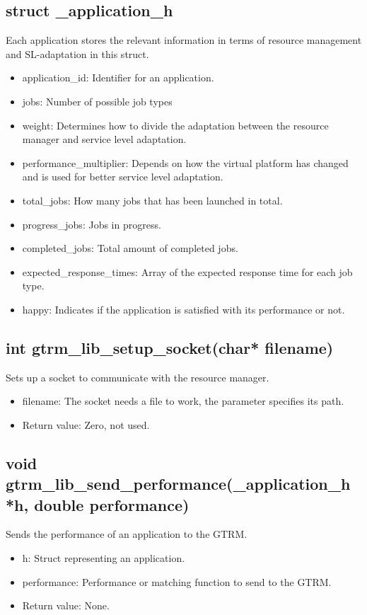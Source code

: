 \documentclass[nobiblatex]{LTHthesis}
\begin{document}
\subsection{struct \_application\_h}
Each application stores the relevant information in terms of resource management and SL-adaptation in this struct.
\begin{itemize}
\item application\_id: Identifier for an application.
\item jobs: Number of possible job types
\item weight: Determines how to divide the adaptation between the resource manager and service level adaptation.
\item performance\_multiplier: Depends on how the virtual platform has changed and is used for better service level adaptation.
\item total\_jobs: How many jobs that has been launched in total.
\item progress\_jobs: Jobs in progress.
\item completed\_jobs: Total amount of completed jobs.
\item expected\_response\_times: Array of the expected response time for each job type.
\item happy: Indicates if the application is satisfied with its performance or not.
\end{itemize}

\subsection{int gtrm\_lib\_setup\_socket(char* filename)}
Sets up a socket to communicate with the resource manager.
\begin{itemize}
\item filename: The socket needs a file to work, the parameter specifies its path.
\item Return value: Zero, not used.
\end{itemize}

\subsection{void gtrm\_lib\_send\_performance(\_application\_h *h, double performance)}
Sends the performance of an application to the GTRM.
\begin{itemize}
\item h: Struct representing an application.
\item performance: Performance or matching function to send to the GTRM.
\item Return value: None.
\end{itemize}
\end{document}

